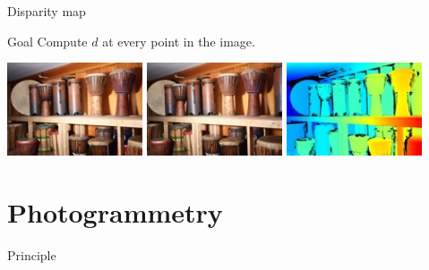 \documentclass{beamer}
\begin{document}
\begin{frame}{Disparity map}
    \begin{block}{Goal}
        Compute $d$ at every point in the image.
    \end{block}
    \vspace{1em}
    \centering
    \includegraphics[width=0.3\textwidth]{images/im0.jpg}
    \includegraphics[width=0.3\textwidth]{images/im1.jpg}
    \includegraphics[width=0.3\textwidth]{images/disp0.jpg}
\end{frame}

\section{Photogrammetry}
\begin{frame}
    \tableofcontents[sectionstyle=show/shaded]
\end{frame}
\begin{frame}{Principle}
\end{frame}
\end{document}
